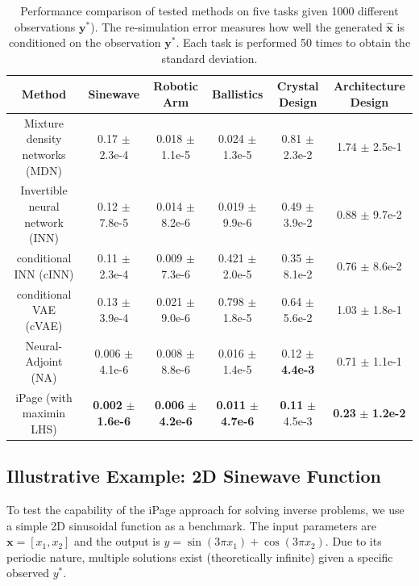 \documentclass[letterpaper]{article} %
\begin{document}
\begin{table}[!htbp]
\footnotesize
\centering
\caption{Performance comparison of tested methods on five tasks given 1000 different observations $\mathbf{y}^*$). The re-simulation error measures how well the generated $\hat{\mathbf{x}}$ is conditioned on the observation $\mathbf{y}^*$. Each task is performed 50 times to obtain the standard deviation.}
\vspace{-0.2cm}
\label{tab:1000_y}
\begin{tabular}{@{}cccccc@{}}
\toprule
Method & Sinewave     & Robotic Arm     & Ballistics     & Crystal Design   & Architecture Design                          \\ \midrule
Mixture density networks (MDN)    & 0.17 $\pm$ 2.3e-4  & 0.018  $\pm$  1.1e-5  & 0.024 $\pm$ 1.3e-5 & 0.81 $\pm$   2.3e-2  & 1.74 $\pm$ 2.5e-1   \\
Invertible neural network (INN)    & 0.12 $\pm$ 7.8e-5  & 0.014  $\pm$  8.2e-6  & 0.019 $\pm$ 9.9e-6 & 0.49 $\pm$ 3.9e-2   & 0.88 $\pm$ 9.7e-2 \\
conditional INN (cINN)   & 0.11 $\pm$ 2.3e-4  & 0.009 $\pm$ 7.3e-6    & 0.421 $\pm$ 2.0e-5   & 0.35 $\pm$ 8.1e-2  & 0.76 $\pm$ 8.6e-2    \\
conditional VAE (cVAE)   & 0.13 $\pm$ 3.9e-4  & 0.021 $\pm$  9.0e-6   & 0.798 $\pm$ 1.8e-5   & 0.64 $\pm$ 5.6e-2  & 1.03 $\pm$ 1.8e-1   \\
Neural-Adjoint (NA)     & 0.006 $\pm$ 4.1e-6 & 0.008  $\pm$  8.8e-6  & 0.016 $\pm$ 1.4e-5   & 0.12 $\pm$  {\bf 4.4e-3}  & 0.71 $\pm$ 1.1e-1 \\ \midrule
iPage (with maximin LHS)  & {\bf 0.002} $\pm$ {\bf 1.6e-6} & {\bf 0.006}  $\pm$  {\bf 4.2e-6}  & {\bf 0.011} $\pm$ {\bf 4.7e-6}   & {\bf 0.11} $\pm$ 4.5e-3  & {\bf 0.23} $\pm$ {\bf 1.2e-2} \\ \bottomrule
\end{tabular}
\end{table}
\subsection{Illustrative Example: 2D Sinewave Function}
To test the capability of the iPage approach for solving inverse problems, we use a simple 2D sinusoidal function as a benchmark. The input parameters are $\mathbf{x} = [x_1, x_2]$ and the output is $y = \sin(3\pi x_1) + \cos(3\pi x_2)$. Due to its periodic nature, multiple solutions exist (theoretically infinite) given a specific observed $y^*$. 
\end{document}
